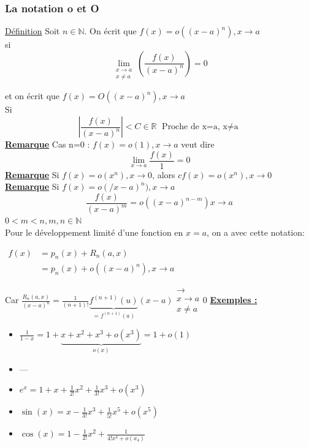 \documentclass[12pt,a4paper]{article}
\newcommand{\limite}{\lim\limits_}
\newcommand{\llimite}[3]{\limite{\substack{#1 \\ #2}}\left(#3\right)}
\newcommand{\evid}[1]{\textbf{\underline{#1}}}
\newcommand{\R}{\ensuremath{\mathbb{R}} }
\newcommand{\N}{\ensuremath{\mathbb{N}} }
\newcommand{\Definition}{\underline{Définition} }
\begin{document}
{\subsubsection{La notation o et O}
\begin{boite}
	\Definition Soit $n \in \N$. On écrit que $f(x) = o((x-a)^n), x\to a$\\
	si 
	\begin{equation}
		\llimite{x\to a}{x\neq a}{\frac{f(x)}{(x-a)^n}} = 0
	\end{equation}
\end{boite}
et on écrit que $f(x) = O((x-a)^n), x\to a$\\
Si
 \begin{equation}
	\left|\frac{f(x)}{(x-a)^n}\right| < C \in \R \text{ Proche de x=a, x$\neq$a}
\end{equation}
\evid{Remarque} Cas n=0 : $f(x) = o(1), x\to a$ veut dire
\begin{equation}
	 \limite{x\to a}\frac{f(x)}{1}=0
\end{equation}
\evid{Remarque} Si $f(x) =o(x^n), x\to 0$, alors $cf(x) = o(x^n), x\to 0$
\evid{Remarque} Si $f(x) = o(/x-a)^n), x\to a$
\begin{equation}
	\frac{f(x)}{(x-a)^m} = o((x-a)^{n-m}) x\to a
\end{equation}
$0 <m < n, m,n \in \N$\\
Pour le développement limité d'une fonction en $x=a$, on a avec cette notation:
\begin{boite}
$\begin{array}{ll}
	f(x) &= p_n(x)+R_n(a,x) \\
	&= p_n(x)+o((x-a)^n), x\to a
\end{array}$
\end{boite}
Car $\frac{R_n(a,x)}{(x-a)^n} = \frac{1}{(n+1)!}\underbrace{f^{(n+1)}(u)}_{=f^{(n+1)}(a)}(x-a) \substack{\to\\ x\to a\\ x\neq a} 0$
\evid{Exemples :}\\
\begin{itemize}
	\item $\frac{1}{1-x} = 1+\underbrace{x+x^2 + x^3 + o(x^3)}_{o(x)} = 1+o(1)$
	\item ---
	\item $e^x=1+x+\frac{1}{2!}x^2 + \frac{1}{3!}x^3+o(x^3)$
	\item $\sin(x) = x-\frac{1}{3!}x^3 +\frac{1}{5!}x^5 + o(x^5)$
	\item $\cos(x) = 1-\frac{1}{2!}x^2+\frac{1}{4!x^4+o(x_4)}$

\end{itemize}}
\end{document}
